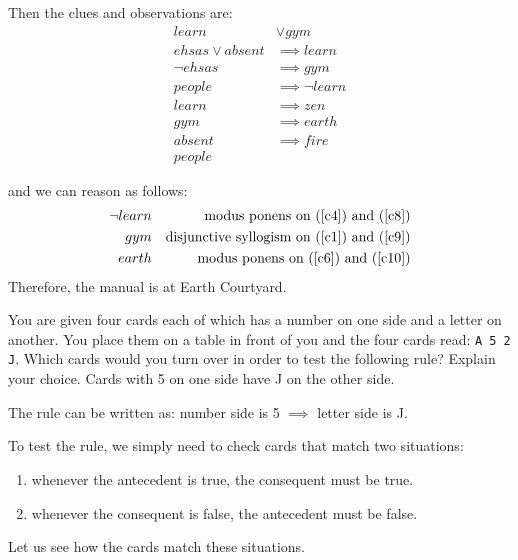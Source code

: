 \documentclass[a4paper]{exam}
\begin{document}
\begin{questions}
\begin{solution}
    Then the clues and observations are:
    \begin{align}
      learn & \lor gym \label{c1}\\
      ehsas\lor absent & \implies learn \label{c2}\\
      \neg ehsas & \implies gym \label{c3}\\
      people & \implies \neg learn \label{c4}\\
      learn & \implies zen \label{c5}\\
      gym & \implies earth \label{c6}\\
      absent & \implies fire \label{c7}\\
      people \label{c8}
    \end{align}

    and we can reason as follows:
    \begin{align}
      \neg learn && \text{modus ponens on (\ref{c4}) and (\ref{c8})} \label{c9}\\
      gym && \text{disjunctive syllogism on (\ref{c1}) and (\ref{c9})} \label{c10}\\
      earth && \text{modus ponens on (\ref{c6}) and (\ref{c10})} \label{c11}
    \end{align}
    Therefore, the manual is at Earth Courtyard.
  \end{solution}

 You are given four cards each of which has a number on one side and a letter on another. You place them on a table in front of you and the four cards read: \texttt{A 5 2 J}. Which cards would you turn over in order to test the following rule? Explain your choice.
      {\quotation Cards with 5 on one side have J on the other side.}

  \begin{solution}
    The rule can be written as: number side is 5 $\implies$ letter side is J.

    To test the rule, we simply need to check cards that match two situations:
    \begin{enumerate}
    \item\label{ant} whenever the antecedent is true, the consequent must be true.
    \item\label{con} whenever the consequent is false, the antecedent must be false.
    \end{enumerate}

    Let us see how the cards match these situations.


\end{solution}
\end{questions}
\end{document}
